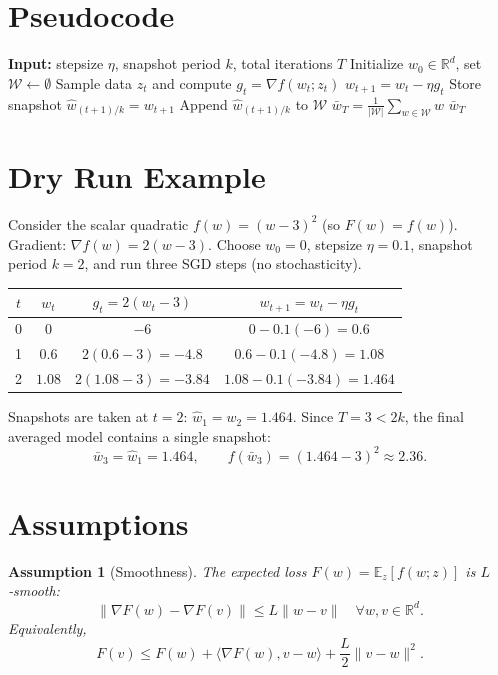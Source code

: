 \documentclass{article}
\newtheorem{assumption}{Assumption}
\begin{document}
\section*{Pseudocode}
\begin{algorithm}[H]
\caption{SWA‑k}
\begin{algorithmic}[1]
\STATE \textbf{Input:} stepsize $\eta$, snapshot period $k$, total iterations $T$
\STATE Initialize $w_0\in\mathbb{R}^d$, set $\mathcal{W}\leftarrow\emptyset$
    \STATE Sample data $z_t$ and compute $g_t=\nabla f(w_t;z_t)$
    \STATE $w_{t+1}=w_t-\eta g_t$ \hfill{}
        \STATE Store snapshot $\widehat w_{(t+1)/k}=w_{t+1}$ \hfill{}
        \STATE Append $\widehat w_{(t+1)/k}$ to $\mathcal{W}$
    \ENDIF
\ENDFOR
\STATE $\displaystyle \bar w_T=\frac{1}{|\mathcal{W}|}\sum_{w\in\mathcal{W}} w$ \hfill{}
\RETURN $\bar w_T$
\end{algorithmic}
\end{algorithm}

\section*{Dry Run Example}
Consider the scalar quadratic $f(w)=(w-3)^2$ (so $F(w)=f(w)$).  
Gradient: $\nabla f(w)=2(w-3)$.  
Choose $w_0=0$, stepsize $\eta=0.1$, snapshot period $k=2$, and run three SGD steps (no stochasticity).

\begin{center}
\begin{tabular}{c|c|c|c}
$t$ & $w_t$ & $g_t=2(w_t-3)$ & $w_{t+1}=w_t-\eta g_t$ \\ \hline
0 & $0$ & $-6$ & $0-0.1(-6)=0.6$ \\
1 & $0.6$ & $2(0.6-3)=-4.8$ & $0.6-0.1(-4.8)=1.08$ \\
2 & $1.08$ & $2(1.08-3)=-3.84$ & $1.08-0.1(-3.84)=1.464$ \\
\end{tabular}
\end{center}

Snapshots are taken at $t=2$: $\widehat w_{1}=w_{2}=1.464$.  
Since $T=3<2k$, the final averaged model contains a single snapshot:
\[
\bar w_3=\widehat w_{1}=1.464,
\qquad
f(\bar w_3)=(1.464-3)^2\approx2.36 .
\]

\section*{Assumptions}
\begin{assumption}[Smoothness]\label{ass:smooth}
The expected loss $F(w)=\mathbb{E}_z[f(w;z)]$ is $L$‑smooth:
\[
\|\nabla F(w)-\nabla F(v)\|\le L\|w-v\|\quad\forall w,v\in\mathbb{R}^d .
\tag{A1}
\]
Equivalently,
\[
F(v)\le F(w)+\langle\nabla F(w),v-w\rangle+\frac{L}{2}\|v-w\|^{2}.
\tag{A1'}
\]
\end{assumption}
\end{document}
